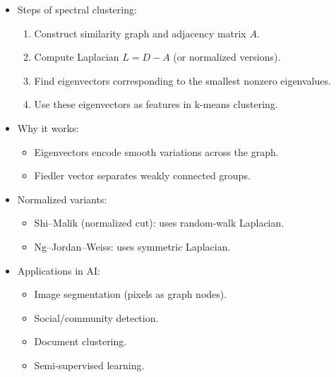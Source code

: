 \documentclass[
  letterpaper,
  DIV=11,
  numbers=noendperiod]{scrreprt}
\providecommand{\tightlist}{%
  \setlength{\itemsep}{0pt}\setlength{\parskip}{0pt}}
\begin{document}
\begin{itemize}
\item
  Steps of spectral clustering:

  \begin{enumerate}
  \def\labelenumi{\arabic{enumi}.}
  \tightlist
  \item
    Construct similarity graph and adjacency matrix \(A\).
  \item
    Compute Laplacian \(L = D - A\) (or normalized versions).
  \item
    Find eigenvectors corresponding to the smallest nonzero eigenvalues.
  \item
    Use these eigenvectors as features in k-means clustering.
  \end{enumerate}
\item
  Why it works:

  \begin{itemize}
  \tightlist
  \item
    Eigenvectors encode smooth variations across the graph.
  \item
    Fiedler vector separates weakly connected groups.
  \end{itemize}
\item
  Normalized variants:

  \begin{itemize}
  \tightlist
  \item
    Shi--Malik (normalized cut): uses random-walk Laplacian.
  \item
    Ng--Jordan--Weiss: uses symmetric Laplacian.
  \end{itemize}
\item
  Applications in AI:

  \begin{itemize}
  \tightlist
  \item
    Image segmentation (pixels as graph nodes).
  \item
    Social/community detection.
  \item
    Document clustering.
  \item
    Semi-supervised learning.
  \end{itemize}
\end{itemize}
\end{document}
